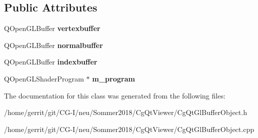 \subsection*{Public Attributes}
\begin{DoxyCompactItemize}
\item 
\mbox{\label{class_cg_qt_gl_buffer_object_aed0a73fe89e760cd1d9a7b1a4d9cfed5}} 
Q\+Open\+G\+L\+Buffer {\bfseries vertexbuffer}
\item 
\mbox{\label{class_cg_qt_gl_buffer_object_a553774fcc3b2d614325a9eafb4f9d862}} 
Q\+Open\+G\+L\+Buffer {\bfseries normalbuffer}
\item 
\mbox{\label{class_cg_qt_gl_buffer_object_a59b6e35b51206b9339c34b144a143d2a}} 
Q\+Open\+G\+L\+Buffer {\bfseries indexbuffer}
\item 
\mbox{\label{class_cg_qt_gl_buffer_object_aa02f7586e43cd919cd558389237c97c9}} 
Q\+Open\+G\+L\+Shader\+Program $\ast$ {\bfseries m\+\_\+program}
\end{DoxyCompactItemize}


The documentation for this class was generated from the following files\+:\begin{DoxyCompactItemize}
\item 
/home/gerrit/git/\+C\+G-\/\+I/neu/\+Sommer2018/\+Cg\+Qt\+Viewer/Cg\+Qt\+Gl\+Buffer\+Object.\+h\item 
/home/gerrit/git/\+C\+G-\/\+I/neu/\+Sommer2018/\+Cg\+Qt\+Viewer/Cg\+Qt\+Gl\+Buffer\+Object.\+cpp\end{DoxyCompactItemize}
